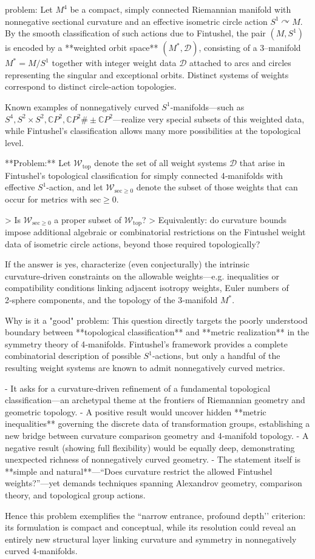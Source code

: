 problem:  
Let \(M^4\) be a compact, simply connected Riemannian manifold with nonnegative sectional curvature and an effective isometric circle action \(S^1 \curvearrowright M\).  By the smooth classification of such actions due to Fintushel, the pair \((M, S^1)\) is encoded by a **weighted orbit space** \((M^*, \mathcal{D})\), consisting of a 3–manifold \(M^* = M / S^1\) together with integer weight data \(\mathcal{D}\) attached to arcs and circles representing the singular and exceptional orbits.  Distinct systems of weights correspond to distinct circle‑action topologies.  

Known examples of nonnegatively curved \(S^1\)-manifolds—such as \(S^4, S^2\times S^2, \mathbb{C}P^2, \mathbb{C}P^2\#\pm \mathbb{C}P^2\)—realize very special subsets of this weighted data, while Fintushel’s classification allows many more possibilities at the topological level.  

**Problem:**  
Let \(\mathcal{W}_{\mathrm{top}}\) denote the set of all weight systems \(\mathcal{D}\) that arise in Fintushel’s topological classification for simply connected 4‑manifolds with effective \(S^1\)-action, and let \(\mathcal{W}_{\mathrm{sec}\ge0}\) denote the subset of those weights that can occur for metrics with \(\mathrm{sec}\ge0\).  

> Is \(\mathcal{W}_{\mathrm{sec}\ge0}\) a proper subset of \(\mathcal{W}_{\mathrm{top}}\)?  
> Equivalently: do curvature bounds impose additional algebraic or combinatorial restrictions on the Fintushel weight data of isometric circle actions, beyond those required topologically?  

If the answer is yes, characterize (even conjecturally) the intrinsic curvature‑driven constraints on the allowable weights—e.g. inequalities or compatibility conditions linking adjacent isotropy weights, Euler numbers of 2‑sphere components, and the topology of the 3‑manifold \(M^*\).  

Why is it a "good" problem:  
This question directly targets the poorly understood boundary between **topological classification** and **metric realization** in the symmetry theory of 4‑manifolds.  Fintushel’s framework provides a complete combinatorial description of possible \(S^1\)-actions, but only a handful of the resulting weight systems are known to admit nonnegatively curved metrics.  

- It asks for a curvature‑driven refinement of a fundamental topological classification—an archetypal theme at the frontiers of Riemannian geometry and geometric topology.  
- A positive result would uncover hidden **metric inequalities** governing the discrete data of transformation groups, establishing a new bridge between curvature comparison geometry and 4‑manifold topology.  
- A negative result (showing full flexibility) would be equally deep, demonstrating unexpected richness of nonnegatively curved geometry.  
- The statement itself is **simple and natural**—“Does curvature restrict the allowed Fintushel weights?”—yet demands techniques spanning Alexandrov geometry, comparison theory, and topological group actions.  

Hence this problem exemplifies the “narrow entrance, profound depth’’ criterion: its formulation is compact and conceptual, while its resolution could reveal an entirely new structural layer linking curvature and symmetry in nonnegatively curved 4‑manifolds.